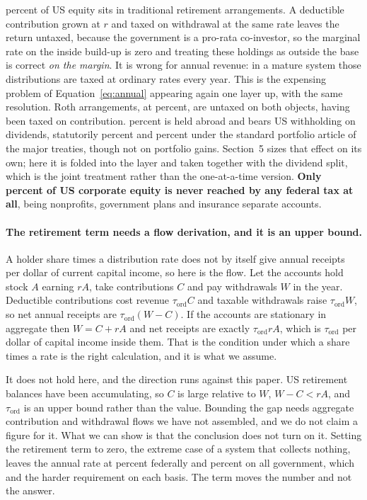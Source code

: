 percent of US equity sits in traditional retirement arrangements.
A deductible contribution grown at $r$ and taxed on withdrawal at the same rate leaves the
return untaxed, because the government is a pro-rata co-investor, so the marginal rate on the
inside build-up is zero and treating these holdings as outside the base is correct \emph{on the
margin}. It is wrong for annual revenue: in a mature system those distributions are taxed at
ordinary rates every year. This is the expensing problem of Equation~\ref{eq:annual} appearing
again one layer up, with the same resolution. Roth arrangements, at
 percent, are untaxed on both objects, having been taxed on contribution.
 percent is held abroad and bears US withholding on dividends,
statutorily  percent and  percent under the
standard portfolio article of the major treaties, though not on portfolio gains. Section~5 sizes
that effect on its own; here it is folded into the layer and taken together with the dividend
split, which is the joint treatment rather than the one-at-a-time version.
\textbf{Only  percent of US corporate equity is never reached by any
federal tax at all}, being nonprofits, government plans and insurance separate accounts.

\paragraph{The retirement term needs a flow derivation, and it is an upper bound.} A holder
share times a distribution rate does not by itself give annual receipts per dollar of current
capital income, so here is the flow. Let the accounts hold stock $A$ earning $rA$, take
contributions $C$ and pay withdrawals $W$ in the year. Deductible contributions cost revenue
$\tau_{\text{ord}}C$ and taxable withdrawals raise $\tau_{\text{ord}}W$, so net annual receipts
are $\tau_{\text{ord}}(W-C)$. If the accounts are stationary in aggregate then $W = C + rA$ and
net receipts are exactly $\tau_{\text{ord}}rA$, which is $\tau_{\text{ord}}$ per dollar of capital
income inside them. That is the condition under which a share times a rate is the right
calculation, and it is what we assume.

It does not hold here, and the direction runs against this paper. US retirement balances have
been accumulating, so $C$ is large relative to $W$, $W-C < rA$, and
$\tau_{\text{ord}}$ is an upper bound rather than the value. Bounding the gap needs aggregate
contribution and withdrawal flows we have not assembled, and we do not claim a figure for it.
What we can show is that the conclusion does not turn on it. Setting the retirement term to
zero, the extreme case of a system that collects nothing, leaves the annual rate at
 percent federally and  percent on all government, which
 and  the harder requirement on each basis. The term
moves the number and not the answer.

